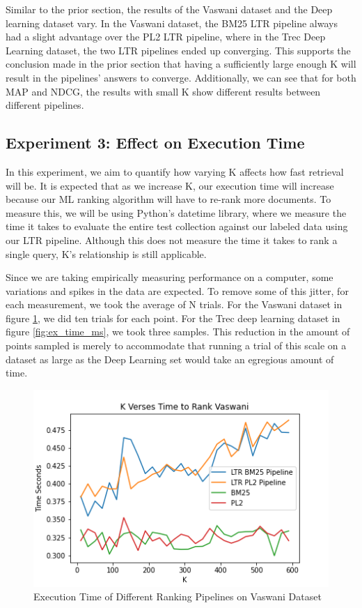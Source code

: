\documentclass[letterpaper,12pt]{article}
\begin{document}
Similar to the prior section, the results of the Vaswani dataset and the Deep learning dataset vary.
In the Vaswani dataset, the BM25 LTR pipeline always had a slight advantage over the PL2 LTR pipeline, where in the Trec Deep Learning dataset, the two LTR pipelines ended up converging.
This supports the conclusion made in the prior section that having a sufficiently large enough K will result in the pipelines' answers to converge.
Additionally, we can see that for both MAP and NDCG, the results with small K show different results between different pipelines.


\subsection{Experiment 3: Effect on Execution Time}

In this experiment, we aim to quantify how varying K affects how fast retrieval will be.
It is expected that as we increase K, our execution time will increase because our ML ranking algorithm will have to re-rank more documents.
To measure this, we will be using Python's datetime library, where we measure the time it takes to evaluate the entire test collection against our labeled data using our LTR pipeline.
Although this does not measure the time it takes to rank a single query, K's relationship is still applicable.

Since we are taking empirically measuring performance on a computer, some variations and spikes in the data are expected.
To remove some of this jitter, for each measurement, we took the average of N trials. For the Vaswani dataset in figure \ref{fig:ex_time_vaswani}, we did ten trials for each point.
For the Trec deep learning dataset in figure \ref{fig:ex_time_ms}, we took three samples.
This reduction in the amount of points sampled is merely to accommodate that running a trial of this scale on a dataset as large as the Deep Learning set would take an egregious amount of time. 

\begin{figure}[h!]
    \centering  %
    \includegraphics[width=.81\textwidth]{K-Verses-Time-to-Rank-Vaswani.png} %
    \caption{Execution Time of Different Ranking Pipelines on Vaswani Dataset} %
    \label{fig:ex_time_vaswani} %
\end{figure}
\end{document}

